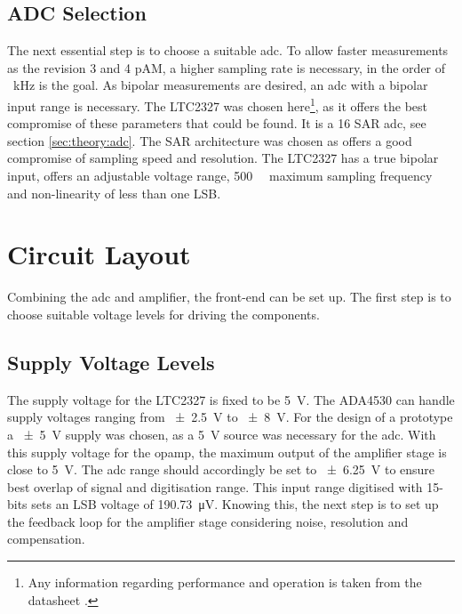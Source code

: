 \subsection*{ADC Selection}
The next essential step is to choose a suitable \ac{adc}. To allow faster measurements as the revision 3 and 4 \ac{pAM}, a higher sampling rate is necessary, in the order of \SI{}{\kilo\hertz} is the goal. As bipolar measurements are desired, an \ac{adc} with a bipolar input range is necessary.
The LTC2327 was chosen here\footnote{Any information regarding performance and operation is taken from the datasheet \cite{LTC2327}.}, as it offers the best compromise of these parameters that could be found. It is a \SI{16}{\bit} \ac{SAR} \ac{adc}, see section \ref{sec:theory:adc}. The \ac{SAR} architecture was chosen as offers a good compromise of sampling speed and resolution. The LTC2327 has a true bipolar input, offers an adjustable voltage range, \SI{500}{\kilo\sps} maximum sampling frequency and non-linearity of less than one LSB. 

\section{Circuit Layout}
Combining the \ac{adc} and amplifier, the front-end can be set up. The first step is to choose suitable voltage levels for driving the components.
\subsection*{Supply Voltage Levels}
The supply voltage for the LTC2327 is fixed to be \SI{5}{\volt}. The ADA4530 can handle supply voltages ranging from \SI{\pm2.5}{\volt} to \SI{\pm8}{\volt}. For the design of a prototype a \SI{\pm5}{\volt} supply was chosen, as a \SI{5}{\volt} source was necessary for the \ac{adc}. With this supply voltage for the \ac{opamp}, the maximum output of the amplifier stage is close to \SI{5}{\volt}. The \ac{adc} range should accordingly be set to \SI{\pm6.25}{\volt} to ensure best overlap of signal and digitisation range. This input range digitised with 15-bits sets an \ac{LSB} voltage of \SI{190.73}{\micro\volt}. 
Knowing this, the next step is to set up the feedback loop for the amplifier stage considering noise, resolution and compensation.\\
